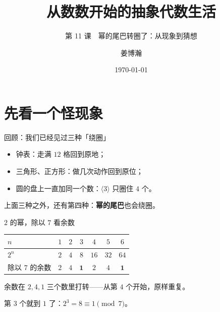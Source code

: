 \documentclass[10pt]{beamer}
\title{从数数开始的抽象代数生活}
\subtitle{第 11 课　幂的尾巴转圈了：从现象到猜想}
\author{姜博瀚}
\institute{厦门大学附属实验中学}
\date{\today}
\begin{document}
\begin{frame}
  \titlepage
\end{frame}

\section{先看一个怪现象}

\begin{frame}{回顾：我们已经见过三种「绕圈」}
  \begin{itemize}
    \item 钟表：走满 \(12\) 格回到原地；
    \item 三角形、正方形：做几次动作回到原位；
    \item 圆的盘上一直加同一个数：\(\langle 3\rangle\) 只圈住 \(4\) 个。
  \end{itemize}
  \pause
  \begin{center}
    {\large 上面三种之外，还有第四种：\textbf{幂的尾巴}也会绕圈。}
  \end{center}
\end{frame}

\begin{frame}{\(2\) 的幂，除以 \(7\) 看余数}
  \begin{center}
  \begin{tabular}{@{}lcccccc@{}}
    \toprule
    \(n\) & \(1\) & \(2\) & \(3\) & \(4\) & \(5\) & \(6\) \\
    \midrule
    \(2^n\) & \(2\) & \(4\) & \(8\) & \(16\) & \(32\) & \(64\) \\
    除以 \(7\) 的余数 & \(2\) & \(4\) & \(\mathbf{1}\) & \(2\) & \(4\) & \(\mathbf{1}\) \\
    \bottomrule
  \end{tabular}
  \end{center}
  \pause
  \begin{center}
    {\large 余数在 \(2,4,1\) 三个数里打转——从第 \(4\) 个开始，原样重复。}
  \end{center}
  \pause
  \begin{center}
    {\large 第 \(3\) 个就到 \(1\) 了：\(2^3=8\equiv1\pmod 7\)。}
  \end{center}
\end{frame}
\end{document}

